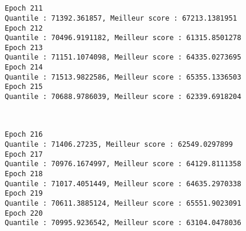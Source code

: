\documentclass[11pt]{article}
\begin{document}
    \begin{center}
    \end{center}
    { \hspace*{\fill} \\}
    
    \begin{center}
    \end{center}
    { \hspace*{\fill} \\}
    
    \begin{Verbatim}[commandchars=\\\{\}]
Epoch 211
Quantile : 71392.361857, Meilleur score : 67213.1381951
Epoch 212
Quantile : 70496.9191182, Meilleur score : 61315.8501278
Epoch 213
Quantile : 71151.1074098, Meilleur score : 64335.0273695
Epoch 214
Quantile : 71513.9822586, Meilleur score : 65355.1336503
Epoch 215
Quantile : 70688.9786039, Meilleur score : 62339.6918204

    \end{Verbatim}

    \begin{center}
    \end{center}
    { \hspace*{\fill} \\}
    
    \begin{Verbatim}[commandchars=\\\{\}]
Epoch 216
Quantile : 71406.27235, Meilleur score : 62549.0297899
Epoch 217
Quantile : 70976.1674997, Meilleur score : 64129.8111358
Epoch 218
Quantile : 71017.4051449, Meilleur score : 64635.2970338
Epoch 219
Quantile : 70611.3885124, Meilleur score : 65551.9023091
Epoch 220
Quantile : 70995.9236542, Meilleur score : 63104.0478036

    \end{Verbatim}

    \begin{center}
    \end{center}
    { \hspace*{\fill} \\}
    
    \begin{center}
    \end{center}
    { \hspace*{\fill} \\}
    
\end{document}
